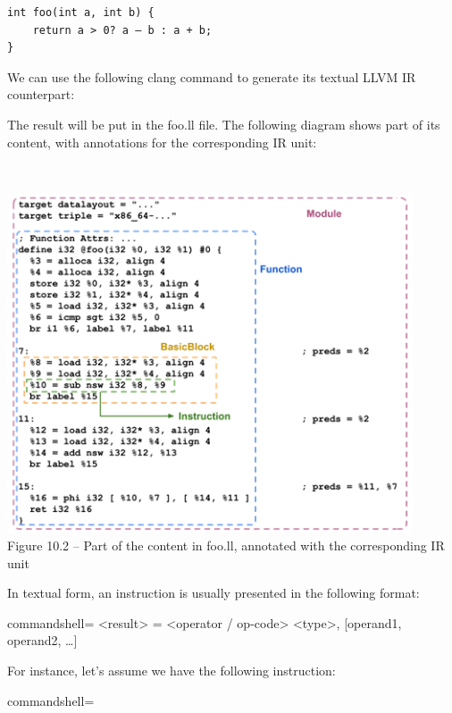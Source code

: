 \begin{lstlisting}[style=styleCXX]
int foo(int a, int b) {
	return a > 0? a – b : a + b;
}
\end{lstlisting}

We can use the following clang command to generate its textual LLVM IR counterpart:


The result will be put in the foo.ll file. The following diagram shows part of its content, with annotations for the corresponding IR unit:

\hspace*{\fill} \\ %
\begin{center}
\includegraphics[width=0.9\textwidth]{content/3/chapter10/images/2.png}\\
Figure 10.2 – Part of the content in foo.ll, annotated with the corresponding IR unit
\end{center}

In textual form, an instruction is usually presented in the following format:

\begin{tcblisting}{commandshell={}}
<result> = <operator / op-code> <type>, [operand1, operand2, …]
\end{tcblisting}

For instance, let's assume we have the following instruction:

\begin{tcblisting}{commandshell={}}
\end{tcblisting}

